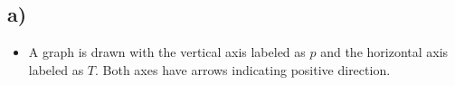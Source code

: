

\subsection*{a)}

\begin{itemize}
    \item A graph is drawn with the vertical axis labeled as \( p \) and the horizontal axis labeled as \( T \). Both axes have arrows indicating positive direction.
\end{itemize}
